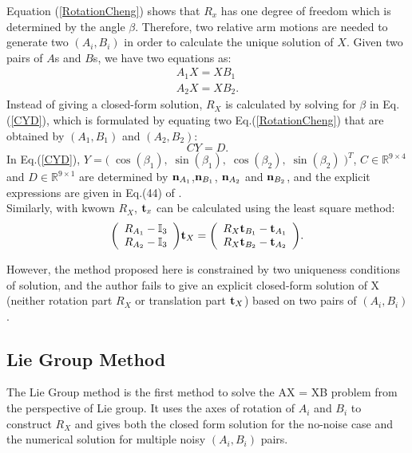 \documentclass[twocolumn,10pt]{asme2ej}
\newcommand{\nn}{{\bf n}}
\newcommand{\ttt}{{\bf t}}
\begin{document}
Equation (\ref{RotationCheng}) shows that $R_{x}$ has one degree of freedom which is determined by the angle $\beta$. Therefore, two relative arm motions are needed to generate two $(A_{i}, B_{i})$ in order to calculate the unique solution of $X$. Given two pairs of $A$s and $B$s, we have two equations as:
\begin{equation}
\begin{array}{lr}
A_{1}X = XB_{1} \\
A_{2}X = XB_{2}.
\end{array}
\end{equation}
Instead of giving a closed-form solution, $R_{X}$ is calculated by solving for $\beta$ in Eq.(\ref{CYD}), which is formulated by equating two Eq.(\ref{RotationCheng}) that are obtained by $(A_{1}, B_{1})$ and $(A_{2}, B_{2})$:
\begin{equation}
CY = D.
\label{CYD}
\end{equation}
In Eq.(\ref{CYD}), $Y = \big( \; \cos(\beta_{1}),\; \sin(\beta_{1}), \; \cos(\beta_{2}),\; 	\sin(\beta_{2}) \;\big)^{T}$,  $C \in \mathbb{R}^{9 \times 4}$ and $D \in \mathbb{R}^{9 \times 1}$ are determined by $\nn_{A_{1}}$,$\nn_{B_{1}}$, $\nn_{A_{2}}$ and $\nn_{B_{2}}$, and the explicit expressions are given in Eq.(44) of \cite{shiu1989calibration}.\\
 Similarly, with kwown $R_{X}$, $\ttt_{x}$ can be calculated using the least square method:
\begin{equation}
\bigg(\begin{array}{lr}
R_{A_{1}} - \mathbb{I}_{3} \\
R_{A_{2}} - \mathbb{I}_{3}
\end{array}\bigg)\ttt_{X}=
\bigg(\begin{array}{lr}
R_{X}\ttt_{B_{1}} - \ttt_{A_{1}}\\
R_{X}\ttt_{B_{2}} - \ttt_{A_{2}}
\end{array}
\bigg).
\label{trans}
\end{equation}


However, the method proposed here is constrained by two uniqueness conditions of solution, and the author fails to give an explicit closed-form solution of X (neither rotation part $R_{X}$ or translation part $\ttt_{X}$) based on two pairs of $(A_{i},B_{i})$.

\subsection{Lie Group Method }
The Lie Group method \cite{park1994robot} is the first method to solve the AX = XB problem from the perspective of Lie group. It uses the axes of rotation of $A_{i}$ and $B_{i}$ to construct $R_{X}$ and gives both the closed form solution for the no-noise case and the numerical solution for multiple noisy $(A_{i}, B_{i})$ pairs.
\end{document}
